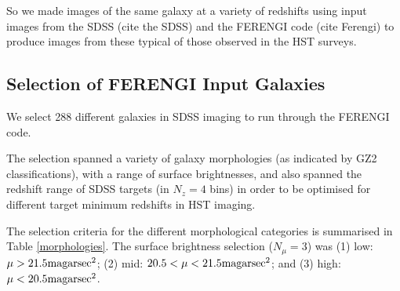 \documentclass[usenatbib]{mn2e}
\begin{document}
So we made images of the same galaxy at a variety of redshifts using input images from the SDSS (cite the SDSS) and the FERENGI code (cite Ferengi) to produce images from these typical of those observed in the HST surveys. 
 
\subsection{Selection of FERENGI Input Galaxies}

We select 288 different galaxies in SDSS imaging to run through the FERENGI code.

The selection spanned a variety of galaxy morphologies (as indicated by GZ2 classifications), with a range of surface brightnesses, and also spanned the redshift range of SDSS targets (in $N_z = 4$ bins) in order to be optimised for different target minimum redshifts in HST imaging. 

 The selection criteria for the different morphological categories is summarised in Table \ref{morphologies}. The surface brightness selection ($N_\mu = 3$) was (1) low: $\mu > 21.5 {\rm mag arsec}^2$;  (2) mid: $20.5 < \mu < 21.5 {\rm mag arsec}^2$; and (3) high: $\mu < 20.5 {\rm mag arsec}^2$. 
 
\end{document}
